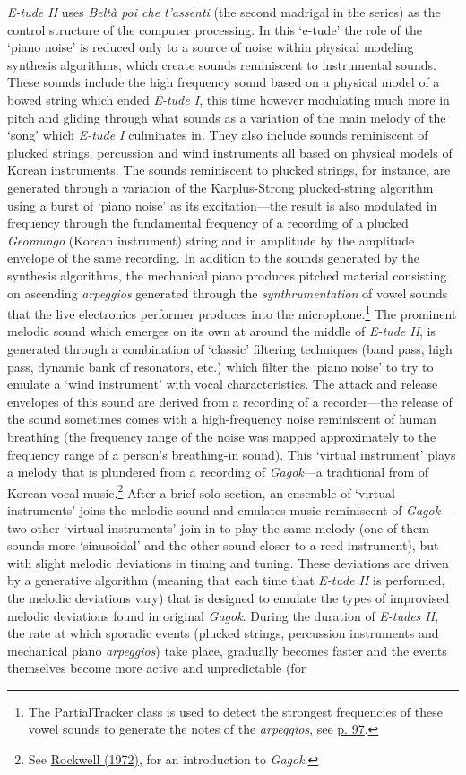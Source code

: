 \emph{E-tude II} uses \emph{Belt\`{a} poi che t'assenti} (the second madrigal in the series) as the control structure of the computer processing. In this `e-tude' the role of the `piano noise' is reduced only to a source of noise within physical modeling synthesis algorithms, which create sounds reminiscent to instrumental sounds. These sounds include the high frequency sound based on a physical model of a bowed string which ended \emph{E-tude I}, this time however modulating much more in pitch and gliding through what sounds as a variation of the main melody of the `song' which \emph{E-tude I} culminates in. They also include sounds reminiscent of plucked strings, percussion and wind instruments all based on physical models of Korean instruments. The sounds reminiscent to plucked strings, for instance, are generated through a variation of the Karplus-Strong plucked-string algorithm using a burst of `piano noise' as its excitation---the result is also modulated in frequency through the fundamental frequency of a recording of a plucked \emph{Geomungo} (Korean instrument) string and in amplitude by the amplitude envelope of the same recording. In addition to the sounds generated by the synthesis algorithms, the mechanical piano produces pitched material consisting on ascending \emph{arpeggios} generated through the \emph{synthrumentation} of vowel sounds that the live electronics performer produces into the microphone.\footnote{The PartialTracker class is used to detect the strongest frequencies of these vowel sounds to generate the notes of the \emph{arpeggios}, see \hyperlink{partrack}{p. 97}.} The prominent melodic sound which emerges on its own at around the middle of \emph{E-tude II}, is generated through a combination of `classic' filtering techniques (band pass, high pass, dynamic bank of resonators, etc.) which filter the `piano noise' to try to emulate a `wind instrument' with vocal characteristics. The attack and release envelopes of this sound are derived from a recording of a recorder---the release of the sound sometimes comes with a high-frequency noise reminiscent of human breathing (the frequency range of the noise was mapped approximately to the frequency range of a person's breathing-in sound). This `virtual instrument' plays a melody that is plundered from a recording of \emph{Gagok}---a traditional from of Korean vocal music.\footnote{See \hyperlink{rockwell}{Rockwell (1972)}, for an introduction to \emph{Gagok}.} After a brief solo section, an ensemble of `virtual instruments' joins the melodic sound and emulates music reminiscent of \emph{Gagok}---two other `virtual instruments' join in to play the same melody (one of them sounds more `sinusoidal' and the other sound closer to a reed instrument), but with slight melodic deviations in timing and tuning. These deviations are driven by a generative algorithm (meaning that each time that \emph{E-tude II} is performed, the melodic deviations vary) that is designed to emulate the types of improvised melodic deviations found in original \emph{Gagok}. During the duration of \emph{E-tudes II}, the rate at which sporadic events (plucked strings, percussion instruments and mechanical piano \emph{arpeggios}) take place, gradually becomes faster and the events themselves become more active and unpredictable (for 